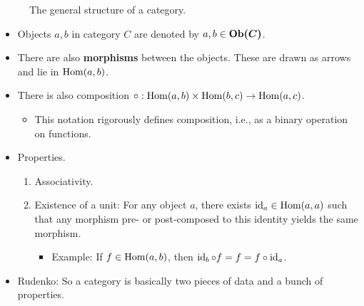\documentclass[../notes.tex]{subfiles}
\begin{document}
\begin{itemize}
\begin{figure}[h!]
        \caption{The general structure of a category.}
        \label{fig:category}
    \end{figure}
    \begin{itemize}
        \item Objects $a,b$ in category $C$ are denoted by $a,b\in\bm{\Ob(C)}$.
        \item There are also \textbf{morphisms} between the objects. These are drawn as arrows and lie in $\operatorname{Hom}(a,b)$.
        \item There is also composition $\circ:\operatorname{Hom}(a,b)\times\operatorname{Hom}(b,c)\to\operatorname{Hom}(a,c)$.
        \begin{itemize}
            \item This notation rigorously defines composition, i.e., as a binary operation on functions.
        \end{itemize}
        \item Properties.
        \begin{enumerate}
            \item Associativity.
            \item Existence of a unit: For any object $a$, there exists $\operatorname{id}_a\in\operatorname{Hom}(a,a)$ such that any morphism pre- or post-composed to this identity yields the same morphism.
            \begin{itemize}
                \item Example: If $f\in\operatorname{Hom}(a,b)$, then $\operatorname{id}_b\circ f=f=f\circ\operatorname{id}_a$.
            \end{itemize}
        \end{enumerate}
        \item Rudenko: So a category is basically two pieces of data and a bunch of properties.

\end{itemize}
\end{itemize}
\end{document}
